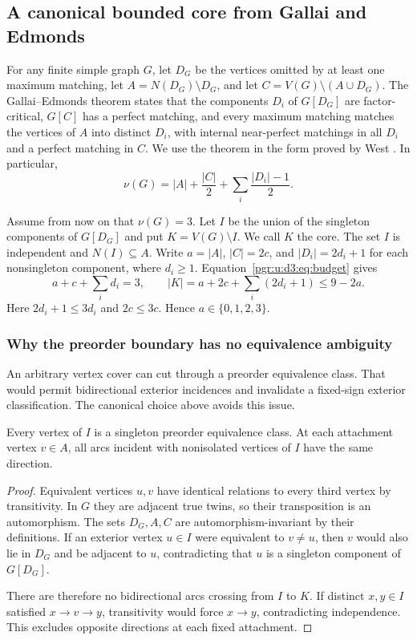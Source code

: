 \documentclass[11pt]{article}
\numberwithin{equation}{section}
\theoremstyle{definition}\newtheorem{definition}[theorem]{Definition}\newtheorem{remark}[theorem]{Remark}
\begin{document}
\subsection{A canonical bounded core from Gallai and Edmonds}

For any finite simple graph $G$, let $D_G$ be the vertices omitted by at least one maximum matching, let $A=N(D_G)\setminus D_G$, and let $C=V(G)\setminus(A\cup D_G)$. The Gallai--Edmonds theorem states that the components $D_i$ of $G[D_G]$ are factor-critical, $G[C]$ has a perfect matching, and every maximum matching matches the vertices of $A$ into distinct $D_i$, with internal near-perfect matchings in all $D_i$ and a perfect matching in $C$. We use the theorem in the form proved by West \cite[Theorem 5]{West}. In particular,
\begin{equation}\label{pgr:u:d3:eq:budget}
 \nu(G)=|A|+\frac{|C|}{2}+\sum_i\frac{|D_i|-1}{2}.
\end{equation}

Assume from now on that $\nu(G)=3$. Let $I$ be the union of the singleton components of $G[D_G]$ and put $K=V(G)\setminus I$. We call $K$ the core. The set $I$ is independent and $N(I)\subseteq A$. Write $a=|A|$, $|C|=2c$, and $|D_i|=2d_i+1$ for each nonsingleton component, where $d_i\ge1$. Equation~\eqref{pgr:u:d3:eq:budget} gives
\begin{equation}\label{pgr:u:d3:eq:corebound}
 a+c+\sum_i d_i=3,\qquad
 |K|=a+2c+\sum_i(2d_i+1)\le9-2a.
\end{equation}
Here $2d_i+1\le3d_i$ and $2c\le3c$. Hence $a\in\{0,1,2,3\}$.

\subsubsection{Why the preorder boundary has no equivalence ambiguity}

An arbitrary vertex cover can cut through a preorder equivalence class. That would permit bidirectional exterior incidences and invalidate a fixed-sign exterior classification. The canonical choice above avoids this issue.

\begin{lemma}\label{pgr:u:d3:lem:exterior}
Every vertex of $I$ is a singleton preorder equivalence class. At each attachment vertex $v\in A$, all arcs incident with nonisolated vertices of $I$ have the same direction.
\end{lemma}
\begin{proof}
Equivalent vertices $u,v$ have identical relations to every third vertex by transitivity. In $G$ they are adjacent true twins, so their transposition is an automorphism. The sets $D_G,A,C$ are automorphism-invariant by their definitions. If an exterior vertex $u\in I$ were equivalent to $v\ne u$, then $v$ would also lie in $D_G$ and be adjacent to $u$, contradicting that $u$ is a singleton component of $G[D_G]$.

There are therefore no bidirectional arcs crossing from $I$ to $K$. If distinct $x,y\in I$ satisfied $x\to v\to y$, transitivity would force $x\to y$, contradicting independence. This excludes opposite directions at each fixed attachment.
\end{proof}
\end{document}
